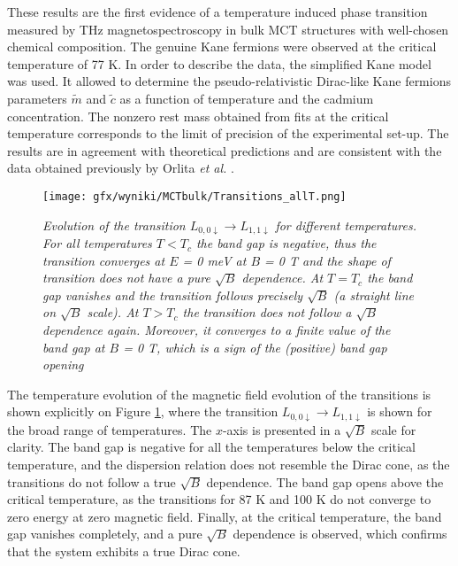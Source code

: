 \documentclass[titlepage,a4paper]{book}
\begin{document}
These results are the first evidence of a temperature induced phase transition measured by THz magnetospectroscopy in bulk MCT structures with well-chosen chemical composition. The genuine Kane fermions were observed at the critical temperature of 77 K. In order to describe the data, the simplified Kane model was used. It allowed to determine the pseudo-relativistic Dirac-like Kane fermions parameters $\tilde{m}$ and $\tilde{c}$ as a function of temperature and the cadmium concentration. The nonzero rest mass obtained from fits at the critical temperature corresponds to the limit of precision of the experimental set-up. The results are in agreement with theoretical predictions and are consistent with the data obtained previously by Orlita \textit{et al.} \cite{Orlita_MCT}.

\begin{figure}[H]
	\centering
	\texttt{[image: gfx/wyniki/MCTbulk/Transitions\_allT.png]}
	\vspace{-10pt}
	\caption{\textit{Evolution of the transition $L_{0,0\downarrow} \rightarrow L_{1,1\downarrow}$ for different temperatures. For all temperatures $T < T_c$ the band gap is negative, thus the transition converges at $E$ = 0 meV at $B$ = 0 T and the shape of transition does not have a pure $\sqrt{B}$ dependence. At $T = T_c$ the band gap vanishes and the transition follows precisely $\sqrt{B}$ (a straight line on $\sqrt{B}$ scale). At $T > T_c$ the transition does not follow a $\sqrt{B}$ dependence again. Moreover, it converges to a finite value of the band gap at $B$ = 0 T, which is a sign of the (positive) band gap opening}}
	\label{fig:Bulk_Transitions_allT}
\end{figure}
The temperature evolution of the magnetic field evolution of the transitions is shown explicitly on Figure \ref{fig:Bulk_Transitions_allT}, where the transition $L_{0,0\downarrow} \rightarrow L_{1,1\downarrow}$ is shown for the broad range of temperatures. The $x$-axis is presented in a $\sqrt{B}$ scale for clarity. The band gap is negative for all the temperatures below the critical temperature, and the dispersion relation does not resemble the Dirac cone, as the transitions do not follow a true $\sqrt{B}$ dependence. The band gap opens above the critical temperature, as the transitions for 87 K and 100 K do not converge to zero energy at zero magnetic field. Finally, at the critical temperature, the band gap vanishes completely, and a pure $\sqrt{B}$ dependence is observed, which confirms that the system exhibits a true Dirac cone.
\end{document}
